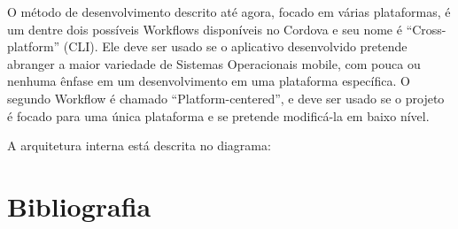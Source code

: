 \documentclass[a4paper,12pt]{article}
\begin{document}
  O método de desenvolvimento descrito até agora, focado em várias plataformas, é um dentre dois possíveis Workflows disponíveis no Cordova e seu nome é “Cross-platform” (CLI). Ele deve ser usado se o aplicativo desenvolvido pretende abranger a maior variedade de Sistemas Operacionais mobile, com pouca ou nenhuma ênfase em um desenvolvimento em uma plataforma específica.
  O segundo Workflow é chamado “Platform-centered”, e deve ser usado se o projeto é focado para uma única plataforma e se pretende modificá-la em baixo nível.


  A arquitetura interna está descrita no diagrama:





\section{Bibliografia}












 \singlespacing   %

\end{document}
